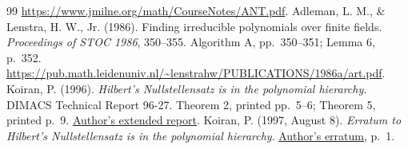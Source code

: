 \documentclass[11pt]{article}
\begin{document}
\begin{thebibliography}{99}
\url{https://www.jmilne.org/math/CourseNotes/ANT.pdf}.
 Adleman, L. M., \& Lenstra, H. W., Jr. (1986).
Finding irreducible polynomials over finite fields.
\emph{Proceedings of STOC 1986}, 350--355.
Algorithm A, pp.~350--351; Lemma 6, p.~352.
\url{https://pub.math.leidenuniv.nl/~lenstrahw/PUBLICATIONS/1986a/art.pdf}.
 Koiran, P. (1996).
\emph{Hilbert's Nullstellensatz is in the polynomial hierarchy}.
DIMACS Technical Report 96-27.
Theorem 2, printed pp.~5--6; Theorem 5, printed p.~9.
\href{https://perso.ens-lyon.fr/pascal.koiran/Publis/DIMACS.96-27.ps}{Author's extended report}.
 Koiran, P. (1997, August 8).
\emph{Erratum to Hilbert's Nullstellensatz is in the polynomial hierarchy}.
\href{https://perso.ens-lyon.fr/pascal.koiran/Publis/hn.erratum.ps}{Author's erratum}, p.~1.
\end{thebibliography}
\end{document}
